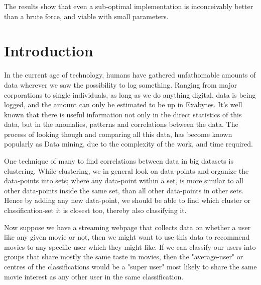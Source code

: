 \documentclass[a4paper]{article}
\begin{document}
The results show that even a sub-optimal implementation is inconceivably better than a brute force, and 
viable with small parameters.

\newpage

%
%
\tableofcontents
\newpage

%
%
\listofalgorithms
\newpage



%
%
\section{Introduction}
\label{sec:intro}
In the current age of technology, humans have gathered unfathomable amounts of data wherever
we saw the possibility to log something. Ranging from major corporations to single individuals,
as long as we do anything digital, data is being logged, and the amount can only be estimated to be
up in Exabytes.
It's well known that there is useful information not only in the direct statistics of this data,
but in the anomalies, patterns and correlations between the data. The process of looking though and
comparing all this data, has become known popularly as Data mining, due to the complexity of the work,
and time required.

One technique of many to find correlations between data in big datasets is clustering. While
clustering, we in general look on data-points and organize the data-points
into sets; where any data-point within a set, is more similar to all other data-points inside
the same set, than all other data-points in other sets. Hence by adding any new
data-point, we should be able to find which cluster or classification-set it is closest too,
thereby also classifying it. \cite{gan07}

Now suppose we have a streaming webpage that collects data on whether a user like any given movie or not,
then we might want to use this data to recommend movies to any specific user which they might like.
If we can classify our users into groups that share mostly the same taste in movies, then
the "average-user" or centres of the classifications would be a "super user" most likely to share the same movie
interest as any other user in the same classification.
\end{document}
